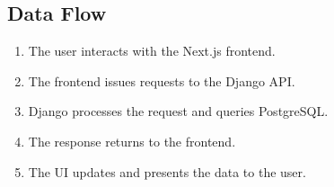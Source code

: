 \subsection{Data Flow}
\begin{enumerate}[leftmargin=*]
	\item The user interacts with the Next.js frontend.
	\item The frontend issues requests to the Django API.
	\item Django processes the request and queries PostgreSQL.
	\item The response returns to the frontend.
	\item The UI updates and presents the data to the user.
\end{enumerate}
